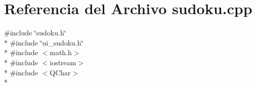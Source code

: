 \section{Referencia del Archivo sudoku.\-cpp}
\label{sudoku_8cpp}
{\ttfamily \#include \char`\"{}sudoku.\-h\char`\"{}}\\*
{\ttfamily \#include \char`\"{}ui\-\_\-sudoku.\-h\char`\"{}}\\*
{\ttfamily \#include $<$math.\-h$>$}\\*
{\ttfamily \#include $<$iostream$>$}\\*
{\ttfamily \#include $<$Q\-Char$>$}\\*
